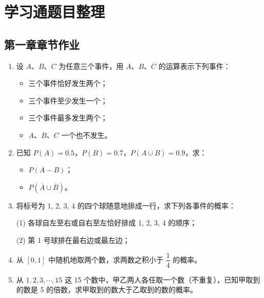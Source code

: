 \section{学习通题目整理}
\subsection{第一章章节作业}
\begin{enumerate}
	\item 设 $A$、$B$、$C$ 为任意三个事件，用 $A$、$B$、$C$ 的运算表示下列事件：
	\begin{itemize}
		\item[(1)] 三个事件恰好发生两个；
		\item[(2)] 三个事件至少发生一个；
		\item[(3)] 三个事件最多发生两个；
		\item[(4)] $A$、$B$、$C$ 一个也不发生。
	\end{itemize}
	
	\vspace{5cm}
	
	\item 已知 $P(A) = 0.5$，$P(B) = 0.7$，$P(A \cup B) = 0.9$，求：
	\begin{itemize}
		\item[(1)] $P(A - B)$；
		\item[(2)] $P(\overline{A} \cup \overline{B})$。
	\end{itemize}
	
	\vspace{5cm}
	
	\item 将标号为 1, 2, 3, 4 的四个球随意地排成一行，求下列各事件的概率：
	\par (1) 各球自左至右或自右至左恰好排成 1, 2, 3, 4 的顺序；
	\par (2) 第 1 号球排在最右边或最左边；
	
	\vspace{5cm}
	
	\item 从 $[0, 1]$ 中随机地取两个数，求两数之积小于 $\dfrac{1}{4}$ 的概率。
	
	\vspace{5cm}
	
	\item 从 $1, 2, 3, \cdots, 15$ 这 15 个数中，甲乙两人各任取一个数（不重复），已知甲取到的数是 5 的倍数，求甲取到的数大于乙取到的数的概率。
	
	\vspace{5cm}
	

\end{enumerate}
